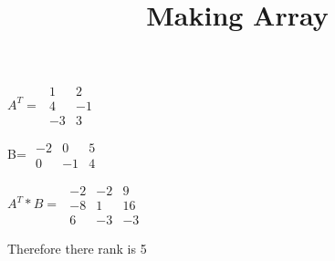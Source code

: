 \documentclass[10pt,a4paper]{article}
\title{Making Array}
\begin{document}
$A^T=$
$\begin{array}{cc}

1 & 2 \\ 
4 & -1 \\ 
-3 & 3
\end{array}$

B=
$\begin{array}{ccc}


 -2 & 0 & 5 \\ 
 0 & -1 & 4
 \end{array}$
 
 
 $A^T*B=$
 $\begin{array}{ccc}



   -2 & -2 & 9 \\ 
   -8 & 1 & 16 \\ 
   6 & -3 & -3
   \end{array}$
  
  
   
   Therefore there rank is 5
      
\end{document}
